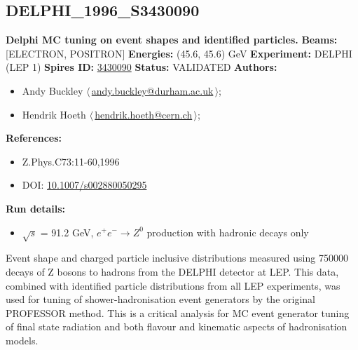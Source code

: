 \subsection[DELPHI\_1996\_S3430090]{DELPHI\_1996\_S3430090\,\cite{Abreu:1996na}}
\textbf{Delphi MC tuning on event shapes and identified particles.}\newline
\textbf{Beams:} [ELECTRON, POSITRON] \newline
\textbf{Energies:} (45.6, 45.6) GeV \newline
\textbf{Experiment:} DELPHI (LEP 1) \newline
\textbf{Spires ID:} \href{http://www.slac.stanford.edu/spires/find/hep/www?rawcmd=key+3430090}{3430090}\newline
\textbf{Status:} VALIDATED\newline
\textbf{Authors:}
\begin{itemize}
  \item Andy Buckley $\langle\,$\href{mailto:andy.buckley@durham.ac.uk}{andy.buckley@durham.ac.uk}$\,\rangle$;
  \item Hendrik Hoeth $\langle\,$\href{mailto:hendrik.hoeth@cern.ch}{hendrik.hoeth@cern.ch}$\,\rangle$;
\end{itemize}
\textbf{References:}
\begin{itemize}
  \item Z.Phys.C73:11-60,1996
  \item DOI: \href{http://dx.doi.org/10.1007/s002880050295}{10.1007/s002880050295}
\end{itemize}
\textbf{Run details:}
\begin{itemize}

  \item \ensuremath{\sqrt{s}} = 91.2 GeV, $e^+ e^- \ensuremath{\to} Z^0$ production with hadronic decays only\end{itemize}

\noindent Event shape and charged particle inclusive distributions measured using 750000 decays of Z bosons to hadrons from the DELPHI detector at LEP. This data, combined with identified particle distributions from all LEP experiments, was used for tuning of shower-hadronisation event generators by the original PROFESSOR method.  This is a critical analysis for MC event generator tuning of final state radiation and both flavour and kinematic aspects of hadronisation models.

\clearpage



